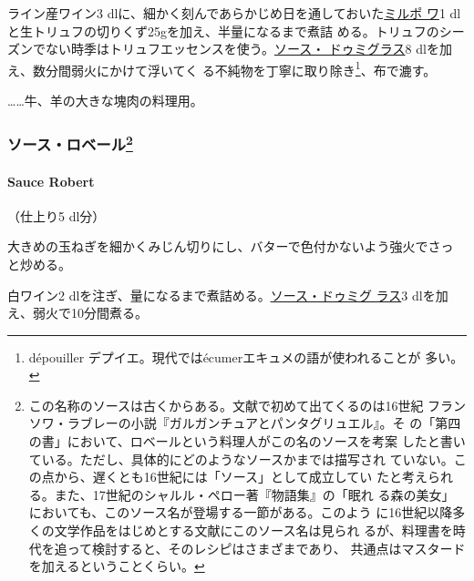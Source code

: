   

ライン産ワイン3
dlに、細かく刻んであらかじめ日を通しておいた\protect\hyperlink{mirepoix}{ミルポ
ワ}1 dlと生トリュフの切りくず25gを加え、半量になるまで煮詰
める。トリュフのシーズンでない時季はトリュフエッセンスを使う。\protect\hyperlink{sauce-demi-glace}{ソース・
ドゥミグラス}8 dlを加え、数分間弱火にかけて浮いてく
る不純物を丁寧に取り除き\footnote{dépouiller
  デプイエ。現代ではécumerエキュメの語が使われることが 多い。}、布で漉す。

\ldots{}\ldots{}牛、羊の大きな塊肉の料理用。

\hypertarget{ux30bdux30fcux30b9ux30edux30d9ux30fcux30eb77}{%
\subsubsection[ソース・ロベール]{\texorpdfstring{ソース・ロベール\footnote{この名称のソースは古くからある。文献で初めて出てくるのは16世紀
  フランソワ・ラブレーの小説『ガルガンチュアとパンタグリュエル』。そ
  の「第四の書」において、ロベールという料理人がこの名のソースを考案
  したと書いている。ただし、具体的にどのようなソースかまでは描写され
  ていない。この点から、遅くとも16世紀には「ソース」として成立してい
  たと考えられる。また、17世紀のシャルル・ペロー著『物語集』の「眠れ
  る森の美女」においても、このソース名が登場する一節がある。このよう
  に16世紀以降多くの文学作品をはじめとする文献にこのソース名は見られ
  るが、料理書を時代を追って検討すると、そのレシピはさまざまであり、
  共通点はマスタードを加えるということくらい。}}{ソース・ロベール}}\label{ux30bdux30fcux30b9ux30edux30d9ux30fcux30eb77}}

\hypertarget{sauce-robert}{%
\paragraph{Sauce Robert}\label{sauce-robert}}

  

（仕上り5 dl分）

大きめの玉ねぎを細かくみじん切りにし、バターで色付かないよう強火でさっ
と炒める。

白ワイン2
dlを注ぎ、\untiers{}量になるまで煮詰める。\protect\hyperlink{sauce-demi-glace}{ソース・ドゥミグ
ラス}3 dlを加え、弱火で10分間煮る。

